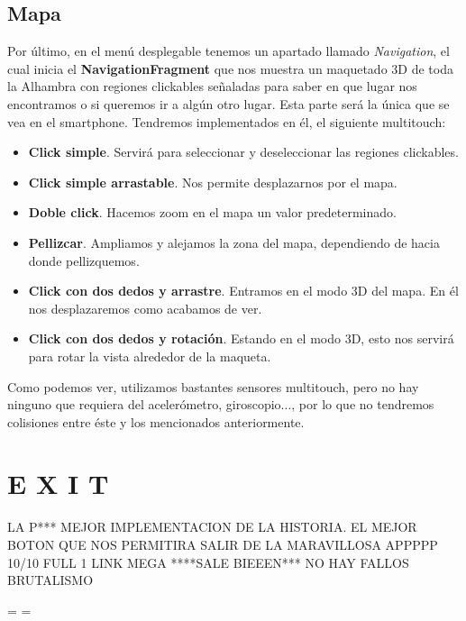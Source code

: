 \documentclass[11pt,a4paper]{article}
\begin{document}
\subsection{Mapa}
\label{sec:mapa}

Por último, en el menú desplegable tenemos un apartado llamado \textit{Navigation}, el cual inicia el \textbf{NavigationFragment} que nos muestra un maquetado 3D
de toda la Alhambra con regiones clickables señaladas para saber en que lugar nos encontramos o si queremos ir a algún otro lugar. Esta parte
será la única que se vea en el smartphone. Tendremos implementados en él, el siguiente multitouch:

\begin{itemize}
    \item \textbf{Click simple}. Servirá para seleccionar y deseleccionar las regiones clickables.
    \item \textbf{Click simple arrastable}. Nos permite desplazarnos por el mapa.
    \item \textbf{Doble click}. Hacemos zoom en el mapa un valor predeterminado.
    \item \textbf{Pellizcar}. Ampliamos y alejamos la zona del mapa, dependiendo de hacia donde pellizquemos.
    \item \textbf{Click con dos dedos y arrastre}. Entramos en el modo 3D del mapa. En él nos desplazaremos como acabamos de ver.
    \item \textbf{Click con dos dedos y rotación}. Estando en el modo 3D, esto nos servirá para rotar la vista alrededor de la maqueta.
\end{itemize}

Como podemos ver, utilizamos bastantes sensores multitouch, pero no hay ninguno que requiera del acelerómetro, giroscopio..., por lo que no tendremos
colisiones entre éste y los mencionados anteriormente.

\section{E X I T}
LA P*** MEJOR IMPLEMENTACION DE LA HISTORIA. EL MEJOR BOTON QUE NOS PERMITIRA SALIR DE LA MARAVILLOSA APPPPP
10/10 FULL 1 LINK MEGA ****SALE BIEEEN*** NO HAY FALLOS
BRUTALISMO


%

\recalctypearea
\pdfpageheight=\paperheight
\pdfpagewidth=\paperwidth
\pagestyle{lscape}
\end{document}
